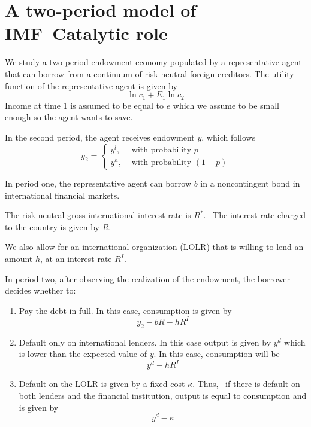 \documentclass[english,12pt,a4paper]{article}
\begin{document}
\section{ A two-period model of IMF\ Catalytic role}

We study a two-period endowment economy populated by a representative agent
that can borrow from a continuum of risk-neutral foreign creditors. The
utility function of the representative agent is given by 
\begin{equation*}
\ln c_{1}+E_{1}\ln c_{2}
\end{equation*}%
Income at time 1 is assumed to be equal to $e$ which we assume to be small
enough so the agent wants to save.

In the second period, the agent receives endowment $y$, which follows 
\begin{equation*}
y_{2}=%
\begin{cases}
y^{l}, & \text{ with probability }p \\ 
y^{h}, & \text{ with probability }\left( 1-p\right)%
\end{cases}%
\end{equation*}

In period one, the representative agent can borrow $b$ in a noncontingent
bond in international financial markets.

The risk-neutral gross international interest rate is $R^{\ast }$. \ The
interest rate charged to the country is given by $R.$

We also allow for an international organization (LOLR) that is willing to
lend an amount $h$, at an interest rate $R^{I}.$

In period two, after observing the realization of the endowment, the
borrower decides whether to:

\begin{enumerate}
\item Pay the debt in full. In this case, consumption is given by%
\begin{equation*}
y_{2}-bR-hR^{I}
\end{equation*}

\item Default only on international lenders. In this case output is given by 
$y^{d}$ which is lower than the expected value of $y.$ In this case,
consumption will be%
\begin{equation*}
y^{d}-hR^{I}
\end{equation*}

\item Default on the LOLR is given by a fixed cost $\kappa .$ Thus, \ if
there is default on both lenders and the financial institution, output is
equal to consumption and is given by 
\begin{equation*}
y^{d}-\kappa 
\end{equation*}
\end{enumerate}
\end{document}
